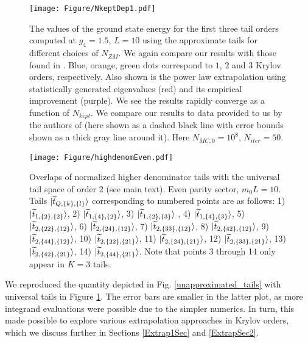 \documentclass[twocolumn,secnumarabic,amssymb, nobibnotes, aps, prd]{revtex4-2}
\begin{document}
\begin{figure}
    \centering
    \texttt{[image: Figure/NkeptDep1.pdf]}%
    \caption{
    The values of the ground state energy for the first three tail orders computed at $g_4=1.5$, $L=10$ using the approximate tails for different choices of $N_{ZM}$.  We again compare our results with those found in \cite{Elias-Miro:2017tup}.  Blue, orange, green dots correspond to $1$, $2$ and $3$ Krylov orders, respectively. Also shown is the power law extrapolation using statistically generated eigenvalues (red) and its empirical improvement (purple).  We see the results rapidly converge as a function of $N_{kept}$. We compare our results to data provided to us by the authors of \cite{Elias-Miro:2017tup} (here shown as a dashed black line with error bounds shown as a thick gray line around it). Here $N_{MC,0}=10^8$, $N_{iter}=50$.}
    \label{approximated_tails}
\end{figure}
\begin{figure}
    \centering
    \texttt{[image: Figure/highdenomEven.pdf]}
    \caption{
    Overlaps of normalized higher denominator tails with the universal tail space of order 2 (see main text). Even parity sector, $m_0L=10$. Tails $\ket{\widetilde t_{Q,\{k\},\{l\}}}$ corresponding to numbered points are as follows: 1) $\ket{\widetilde t_{1,\{2\},\{2\}}}$, 2) $\ket{\widetilde t_{1,\{4\},\{2\}}}$, 3) $\ket{\widetilde t_{1,\{2\},\{3\}}}$ , 4) $\ket{\widetilde t_{1,\{4\},\{3\}}}$, 5) $\ket{\widetilde t_{2,\{22\},\{12\}}}$, 6) $\ket{\widetilde t_{2,\{24\},\{12\}}}$, 7) $\ket{\widetilde t_{2,\{33\},\{12\}}}$, 8) $\ket{\widetilde t_{2,\{42\},\{12\}}}$, 9) $\ket{\widetilde t_{2,\{44\},\{12\}}}$, 10) $\ket{\widetilde t_{2,\{22\},\{21\}}}$, 11) $\ket{\widetilde t_{2,\{24\},\{21\}}}$, 12) $\ket{\widetilde t_{2,\{33\},\{21\}}}$, 13) $\ket{\widetilde t_{2,\{42\},\{21\}}}$, 14) $\ket{\widetilde t_{2,\{44\},\{21\}}}$. Note that points 3 through 14 only appear in $K=3$ tails.}
    \label{FigHighOrdTail_overlaps}
\end{figure}

We reproduced the quantity depicted in Fig. \ref{unapproximated_tails} with universal tails in Figure \ref{approximated_tails}. The error bars are smaller in the latter plot, as more integrand evaluations were possible due to the simpler numerics. In turn, this made possible to explore various extrapolation approaches in Krylov orders, which we discuss further in Sections \ref{Extrap1Sec} and \ref{ExtrapSec2}.
\end{document}
